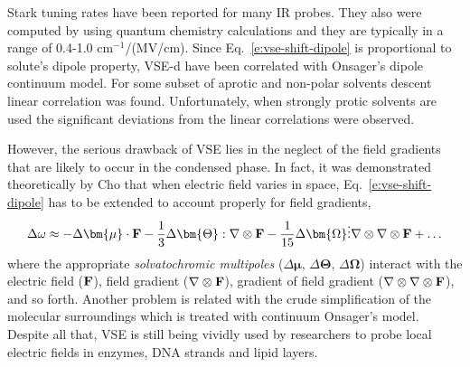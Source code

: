 \documentclass[a4paper,titlepage,twoside,fleqn,12pt]{book}
\newcommand{\BM}[1]{\bm{#1}}
\begin{document}
\begin{refsection}
\begin{equation}
\end{equation}
%
Stark tuning rates have been reported for many IR probes. \citep{Suydam.Boxer.Biochem.2003,Levinson.Fried.Boxer.JPCB.2012}
They also were computed by using quantum chemistry calculations \citep{Dalosto.Vanderkooi.Sharp.JPCB.2004,
Andrews.Boxer.JPCA.2002,Andrews.Boxer.JPCA.2000}
and they are typically in a range of 0.4-1.0 cm$^{-1}$/(MV/cm). 
Since Eq.~\eqref{e:vse-shift-dipole} is proportional to solute's
dipole property, VSE-d have been correlated with Onsager's dipole
continuum model. For some subset of aprotic and non-polar
solvents descent linear correlation was found. \citep{Levinson.Fried.Boxer.JPCB.2012} 
Unfortunately,
when strongly protic solvents are used the significant deviations
from the linear correlations were observed. \citep{Fafarman.Sigala.Herschlag.Boxer.JACS.2010,Bagchi.Fried.Boxer.JACS.2012}

However, the serious drawback of VSE lies in the neglect of the field gradients that are 
likely to occur in the condensed phase. In fact, it was demonstrated theoretically
by Cho \citep{Cho.JCP.2009,Lee.Choi.Cho.JCP.2012} 
that when electric field varies in space, Eq.~\eqref{e:vse-shift-dipole}
has to be extended to account properly for field gradients,
%
\begin{equation} \label{e:vse-shift-multipoles}
 \Delta \omega 
\approx 
             - \Delta {\BM \mu}    \cdot                                {\bf F} 
- \frac{1}{3}  \Delta {\BM \Theta} :                     \nabla \otimes {\bf F}
- \frac{1}{15} \Delta {\BM \Omega} \vdots \nabla \otimes \nabla \otimes {\bf F}
+ \ldots
\end{equation}
%
where the appropriate \emph{solvatochromic multipoles} 
($\Delta {\BM \mu}$, $\Delta {\BM \Theta}$, $\Delta {\BM \Omega}$)
interact with the electric field (${\bf F}$), 
field gradient ($\nabla \otimes {\bf F}$), gradient of field gradient 
($\nabla \otimes \nabla \otimes {\bf F}$),
and so forth.
Another problem is related with the crude simplification of the 
molecular surroundings which is treated with continuum Onsager's model.
Despite all that, VSE is still being vividly
used by researchers to probe local electric fields in enzymes, DNA strands and 
lipid layers. 


\end{refsection}
\end{document}
